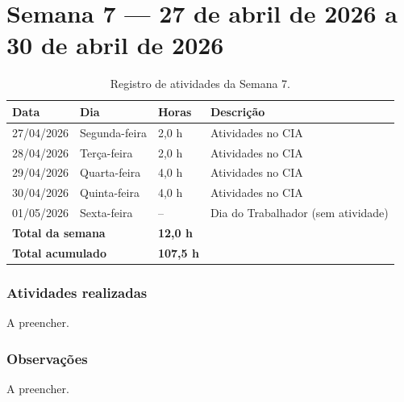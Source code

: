 
\section{Semana 7 --- 27 de abril de 2026 a 30 de abril de 2026}

\begin{table}[H]
\centering
\caption{Registro de atividades da Semana 7.}
\begin{tabular}{llll}
\toprule
\textbf{Data} & \textbf{Dia} & \textbf{Horas} & \textbf{Descrição} \\
\midrule
27/04/2026 & Segunda-feira & 2,0 h & Atividades no CIA \\
28/04/2026 & Terça-feira & 2,0 h & Atividades no CIA \\
29/04/2026 & Quarta-feira & 4,0 h & Atividades no CIA \\
30/04/2026 & Quinta-feira & 4,0 h & Atividades no CIA \\
01/05/2026 & Sexta-feira & -- & Dia do Trabalhador (sem atividade) \\
\midrule
\multicolumn{2}{l}{\textbf{Total da semana}} & \textbf{12,0 h} & \\
\multicolumn{2}{l}{\textbf{Total acumulado}} & \textbf{107,5 h} & \\
\bottomrule
\end{tabular}
\end{table}

\subsubsection*{Atividades realizadas}

A preencher.

\subsubsection*{Observações}

A preencher.
